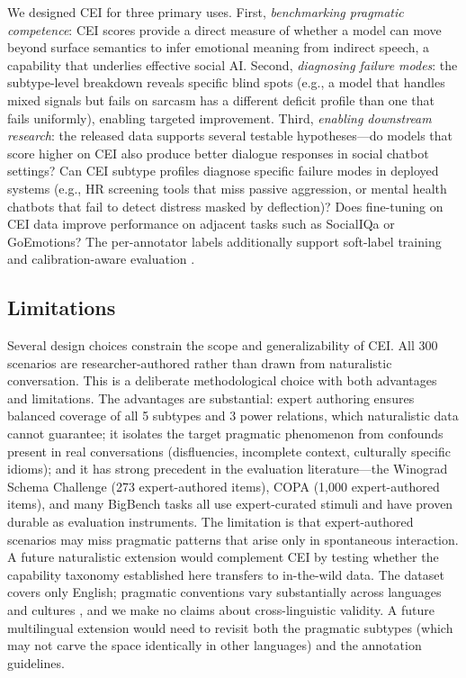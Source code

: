 \documentclass[twoside,11pt]{article}
\begin{document}
We designed CEI for three primary uses. First, \textit{benchmarking pragmatic competence}: CEI scores provide a direct measure of whether a model can move beyond surface semantics to infer emotional meaning from indirect speech, a capability that underlies effective social AI. Second, \textit{diagnosing failure modes}: the subtype-level breakdown reveals specific blind spots (e.g., a model that handles mixed signals but fails on sarcasm has a different deficit profile than one that fails uniformly), enabling targeted improvement. Third, \textit{enabling downstream research}: the released data supports several testable hypotheses---do models that score higher on CEI also produce better dialogue responses in social chatbot settings? Can CEI subtype profiles diagnose specific failure modes in deployed systems (e.g., HR screening tools that miss passive aggression, or mental health chatbots that fail to detect distress masked by deflection)? Does fine-tuning on CEI data improve performance on adjacent tasks such as SocialIQa or GoEmotions? The per-annotator labels additionally support soft-label training and calibration-aware evaluation \citep{uma2021learning}.

\subsection{Limitations}

Several design choices constrain the scope and generalizability of CEI. All 300 scenarios are researcher-authored rather than drawn from naturalistic conversation. This is a deliberate methodological choice with both advantages and limitations. The advantages are substantial: expert authoring ensures balanced coverage of all 5 subtypes and 3 power relations, which naturalistic data cannot guarantee; it isolates the target pragmatic phenomenon from confounds present in real conversations (disfluencies, incomplete context, culturally specific idioms); and it has strong precedent in the evaluation literature---the Winograd Schema Challenge \citep{levesque2012winograd} (273 expert-authored items), COPA \citep{roemmele2011choice} (1,000 expert-authored items), and many BigBench tasks \citep{srivastava2022beyond} all use expert-curated stimuli and have proven durable as evaluation instruments. The limitation is that expert-authored scenarios may miss pragmatic patterns that arise only in spontaneous interaction. A future naturalistic extension would complement CEI by testing whether the capability taxonomy established here transfers to in-the-wild data. The dataset covers only English; pragmatic conventions vary substantially across languages and cultures \citep{levinson1983pragmatics}, and we make no claims about cross-linguistic validity. A future multilingual extension would need to revisit both the pragmatic subtypes (which may not carve the space identically in other languages) and the annotation guidelines.
\end{document}
